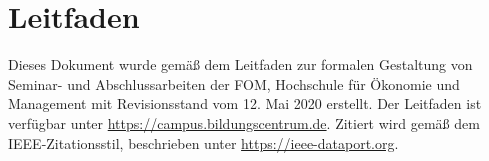 \section*{Leitfaden}


Dieses Dokument wurde gemäß dem Leitfaden zur formalen Gestaltung von Seminar- und Abschlussarbeiten der FOM, Hochschule für Ökonomie und Management mit Revisionsstand vom 12. Mai 2020 erstellt. Der Leitfaden ist verfügbar unter \href{https://campus.bildungscentrum.de/nfcampus/dc/4875/LeitfadenZurFormalenGestaltungSeminarAbschlussarbeiten_BCW_Stud_2020_04_29.pdf}{https://campus.bildungscentrum.de}.\newline
Zitiert wird gemäß dem \acrshort{IEEE}-Zitationsstil, beschrieben unter \href{https://ieee-dataport.org/sites/default/files/analysis/27/IEEE\%20Citation\%20Guidelines.pdf}{https://ieee-dataport.org}.

\newpage